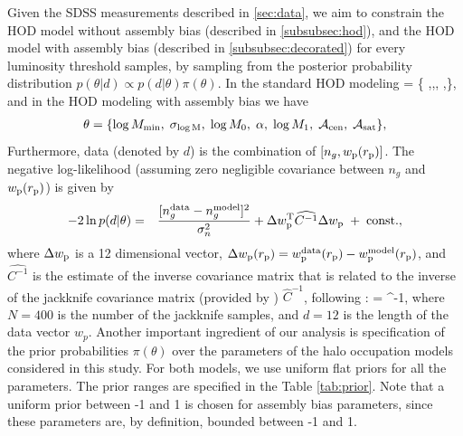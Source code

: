 Given the SDSS measurements described in \ref{sec:data}, we aim to constrain the HOD model without assembly bias (described in \ref{subsubsec:hod}), and the HOD model with assembly bias (described in \ref{subsubsec:decorated}) for every luminosity threshold samples, by sampling from the posterior probability distribution $p(\theta|d) \propto p(d|\theta) \pi(\theta)$. In the standard HOD modeling 
\beq
\theta = \{ \mmin,\;\sigmam,\;\mzero,\; \alpha,\;\mone \},
\eeq
and in the HOD modeling with assembly bias we have 
\begin{eqnarray}
\theta = \{\log M_{\rm min},\; \sigma_{\log \rm M}, \;\log M_{0}, \;\alpha, \;\log M_{1},\;\mathcal{A}_{\rm cen},\; \mathcal{A}_{\rm sat} \},
\end{eqnarray}
Furthermore, data (denoted by $d$) is the combination of $[n_{g}, w_{\rm{p}}(r_{\rm{p}})]$. The negative log-likelihood (assuming zero negligible covariance between $n_{g}$ and $w_{\rm{p}}(r_{\rm{p}})$) is given by
\begin{eqnarray}
-2\ln p(d|\theta) &=& \frac{[n^{\rm data}_{g}-n^{\rm model}_{g}]^{2}}{\sigma_{n}^{2}} + \Delta w_{\rm p}^{\rm T}\widehat{C^{-1}}\Delta w_{\rm p} \; + \; \rm{const.},
\label{eq:lnlike_wp}
\end{eqnarray}
where $\Delta w_{\rm p}$ is a 12 dimensional vector, $\Delta w_{\rm p}(r_{\rm p}) = w_{\rm p}^{\rm data}(r_{\rm p})-w_{\rm p}^{\rm model}(r_{\rm p})$, and  $\widehat{C^{-1}}$ is the estimate of the inverse covariance matrix that is related to the inverse of the jackknife covariance matrix (provided by \citealt{guo2015}) $\widehat{C}^{-1}$, following \citealt{hartlap2007}:
\beq
{} =  \; ^{-1},
\eeq
where $N=400$ is the number of the jackknife samples, and $d=12$ is the length of the data vector $w_{p}$. Another important ingredient of our analysis is specification of the prior probabilities $\pi(\theta)$ over the parameters of the halo occupation models considered in this study. For both models, we use uniform flat priors for all the parameters. The prior ranges are specified in the Table \ref{tab:prior}. Note that a uniform prior between -1 and 1 is chosen for assembly bias parameters, since these parameters are, by definition, bounded between -1 and 1. 
